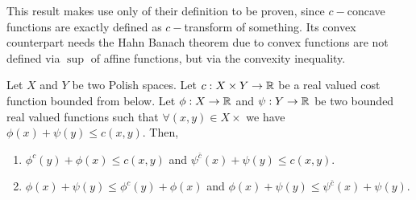This result makes use only of their definition to be proven, since $c-$concave functions are exactly defined as $c-$transform
of something. Its convex counterpart needs the Hahn Banach theorem due to convex functions are not defined via $\sup$ of affine functions, but via the
convexity inequality. 


\begin{lemma}
	Let $X$ and $Y$ be two Polish spaces. Let $c:X\times Y \rightarrow \mathbb{R}$ be a real valued cost function bounded from below. Let $\phi:X\rightarrow \mathbb{R}$ and $\psi:Y\rightarrow\mathbb{R}$ be two bounded real valued functions such that $\forall (x,y)\in X\times$ we have $\phi(x)+\psi(y)\leq c(x,y)$. Then, 
	\begin{enumerate}
		\item $\phi^c(y)+\phi(x)\leq c(x,y)$ and $\psi^{\bar c}(x)+\psi(y)\leq c(x,y)$. 
		\item $\phi(x)+\psi(y)\leq\phi^c(y)+\phi(x) $ and $\phi(x)+\psi(y)\leq\psi^{\bar c}(x)+\psi(y)$.
	\end{enumerate}
\end{lemma}

